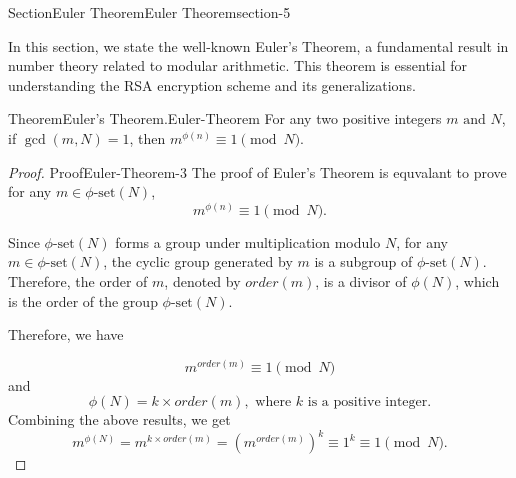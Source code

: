 \documentclass[oneside,12pt,]{article}
\numberwithin{equation}{section}
\begin{document}
\begin{sectionptx}{Section}{Euler Theorem}{}{Euler Theorem}{}{}{section-5}
\begin{introduction}{}%
In this section, we state the well-known Euler’s Theorem, a fundamental result in number theory related to modular arithmetic. This theorem is essential for understanding the RSA encryption scheme and its generalizations.%
\end{introduction}%
\begin{theorem}{Theorem}{Euler's Theorem.}{}{Euler-Theorem}%
For any two positive integers \(m \text{ and } N\), if \(\gcd(m,N) = 1\), then \(m^{\phi(n)} \equiv 1 \pmod N\).%
\end{theorem}
\begin{proof}{Proof}{}{Euler-Theorem-3}
The proof of Euler's Theorem is equvalant to prove for any \(m \in \phi\text{-set}(N)\),%
\begin{equation*}
m^{\phi(n)} \equiv 1 \pmod N\text{.}
\end{equation*}
%
\par
Since \(\phi\text{-set}(N)\) forms a group under multiplication modulo \(N\), for any \(m \in \phi\text{-set}(N)\), the cyclic group generated by \(m\) is a subgroup of \(\phi\text{-set}(N)\). Therefore, the order of \(m\), denoted by \(order(m)\), is a divisor of \(\phi(N)\), which is the order of the group \(\phi\text{-set}(N)\).%
\par
Therefore, we have%
\par
%
\begin{equation*}
m^{order(m)} \equiv 1 \pmod N
\end{equation*}
and%
\begin{equation*}
\phi(N) = k \times order(m), \text{ where } k \text{ is a positive integer.}
\end{equation*}
Combining the above results, we get%
\begin{equation*}
m^{\phi(N)} = m^{k \times order(m)} = (m^{order(m)})^k \equiv 1^k \equiv 1 \pmod N\text{.}
\end{equation*}
%
\end{proof}
\end{sectionptx}
%
%
\typeout{************************************************}
\typeout{************************************************}
%
\end{document}
